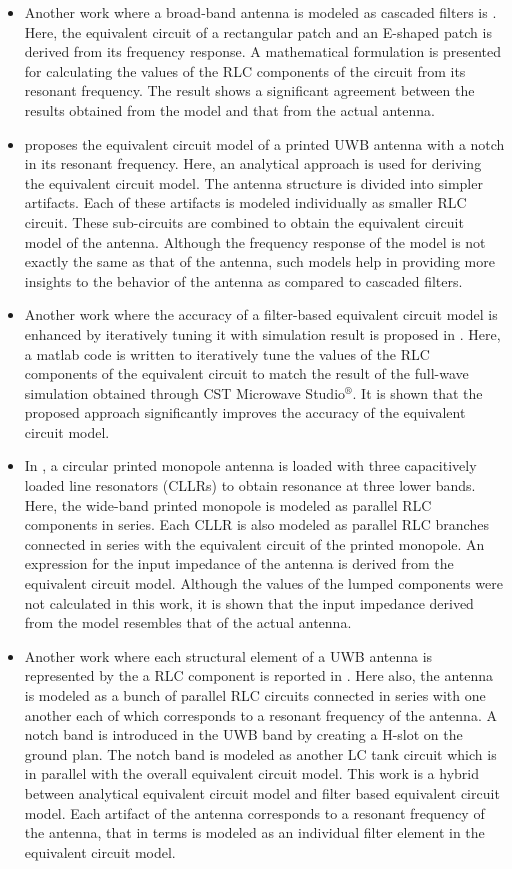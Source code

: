 \begin{itemize}
\item Another work where a broad-band antenna is modeled as cascaded filters is \cite{rectEqCkt}. Here, the equivalent circuit of a rectangular patch and an E-shaped patch is derived from its frequency response. A mathematical formulation is presented for calculating the values of the RLC components of the circuit from its resonant frequency. The result shows a significant agreement between the results obtained from the model and that from the actual antenna.
\item \cite{UwbNotchEqCkt} proposes the equivalent circuit model of a printed UWB antenna with a notch in its resonant frequency. Here, an analytical approach is used for deriving the equivalent circuit model. The antenna structure is divided into simpler artifacts. Each of these artifacts is modeled individually as smaller RLC circuit. These sub-circuits are combined to obtain the equivalent circuit model of the antenna. Although the frequency response of the model is not exactly the same as that of the antenna, such models help in providing more insights to the behavior of the antenna as compared to cascaded filters.
\item Another work where the accuracy of a filter-based equivalent circuit model is enhanced by iteratively tuning it with simulation result is proposed in \cite{UwbPmaEqCkt2}. Here, a matlab code is written to iteratively tune the values of the RLC components of the equivalent circuit to match the result of the full-wave simulation obtained through CST Microwave Studio$^{\circledR}$. It is shown that the proposed approach significantly improves the accuracy of the equivalent circuit model.
\item In \cite{UwbPmaEqCkt3}, a circular printed monopole antenna is loaded with three capacitively loaded line resonators (CLLRs) to obtain resonance at three lower bands. Here, the wide-band printed monopole is modeled as parallel RLC components in series. Each CLLR is also modeled as parallel RLC branches connected in series with the equivalent circuit of the printed monopole. An expression for the input impedance of the antenna is derived from the equivalent circuit model. Although the values of the lumped components were not calculated in this work, it is shown that the input impedance derived from the model resembles that of the actual antenna.
\item Another work where each structural element of a UWB antenna is represented by the a RLC component is reported in \cite{UwbPmaEqCkt4}. Here also, the antenna is modeled as a bunch of parallel RLC circuits connected in series with one another each of which corresponds to a resonant frequency of the antenna. A notch band is introduced in the UWB band by creating a H-slot on the ground plan. The notch band is modeled as another LC tank circuit which is in parallel with the overall equivalent circuit model. This work is a hybrid between analytical equivalent circuit model and filter based equivalent circuit model. Each artifact of the antenna corresponds to a resonant frequency of the antenna, that in terms is modeled as an individual filter element in the equivalent circuit model.

\end{itemize}
